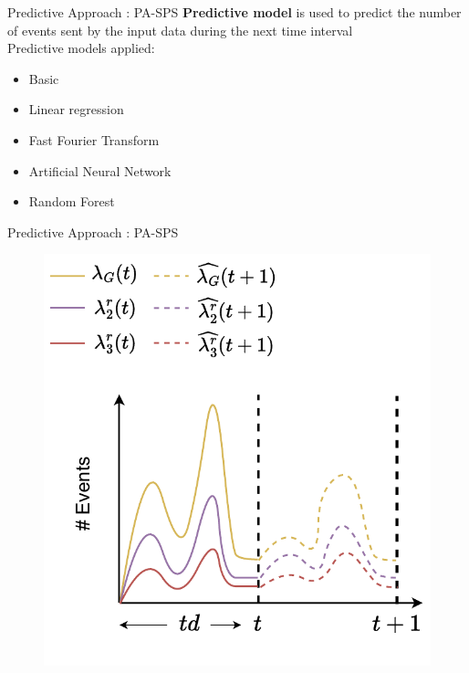 \begin{frame}{Predictive Approach : PA-SPS}
	\textbf{Predictive model} is used to predict the number of events sent by the input data during the next time interval\\
	\vspace*{0.25cm}
	Predictive models applied:
	\begin{itemize}
		\item Basic
		\item Linear regression
		\item Fast Fourier Transform
		\item Artificial Neural Network
		\item Random Forest
	\end{itemize}

\end{frame}

\begin{frame}{Predictive Approach : PA-SPS}
\begin{figure}
    \centering
    \includegraphics[scale=0.63]{images/concepts/predictive/PA-SPS-Prediction-8.pdf}
\end{figure}
\end{frame}

